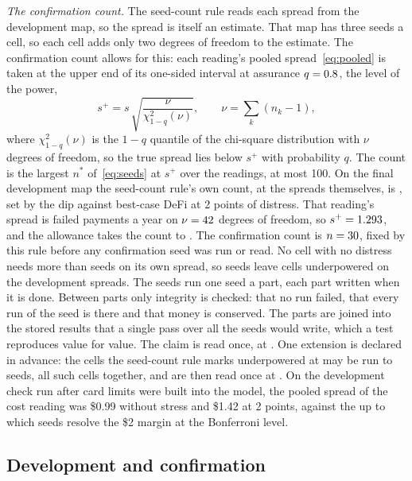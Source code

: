 \emph{The confirmation count.} The seed-count rule reads each spread from the development map, so the spread is
itself an estimate. That map has three seeds a cell, so each cell adds only two degrees of freedom to the estimate.
The confirmation count allows for this: each
reading's pooled spread~\eqref{eq:pooled} is taken at the upper end of its one-sided interval at assurance
$q = 0.8{}$, the level of the power,
\begin{equation}
  s^{+} = s\,\sqrt{\frac{\nu}{\chi^{2}_{1-q}(\nu)}}, \qquad \nu = \sum_{k}(n_{k}-1),
  \label{eq:spreadbound}
\end{equation}
where $\chi^{2}_{1-q}(\nu)$ is the $1-q$ quantile of the chi-square distribution with $\nu$ degrees of freedom, so
the true spread lies below $s^{+}$ with probability $q$. The count is the largest $n^{*}$ of~\eqref{eq:seeds}
at $s^{+}$ over the readings, at most 100. On the final development map the seed-count rule's own count, at the spreads
themselves, is \SeedsPlanned{}, set by the dip against best-case DeFi at 2 points of distress. That reading's spread is
\SpreadBinding{} failed payments a year on $\nu = 42{}$ degrees of freedom, so $s^{+} =
1.293{}$, and the allowance takes the count to \SeedsAssured{}. The confirmation count is
$n = 30{}$, fixed by this rule before any confirmation seed was run or read. No cell with no distress
needs more than \SeedsCellMost{} seeds on its own spread, so \SeedsConfirm{} seeds leave \CellsUnderpowered{} cells
underpowered on the development spreads. The \SeedsConfirm{} seeds run one seed a part, each part written when
it is done. Between parts only integrity is checked: that no run failed, that every run of the seed is there and
that money is conserved. The parts are joined into the stored results that a single pass over all the seeds would
write, which a test reproduces value for value. The claim is read once, at \SeedsConfirm{}.
One extension is declared in advance: the cells the seed-count rule marks underpowered at \SeedsConfirm{} may be run to
\SeedsExtended{} seeds, all such cells together, and are then read once at \SeedsExtended{}. On the development
check run after card limits were built into the model, the pooled spread of the cost reading was \$0.99 without stress and \$1.42 at 2
points, against the \SpreadResolved{} up to which \SeedsConfirm{} seeds resolve the \$2 margin at the Bonferroni
level.

\subsection{Development and confirmation}

